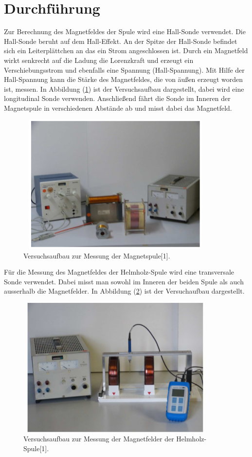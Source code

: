 \section{Durchführung}
Zur Berechnung des Magnetfeldes der Spule wird eine Hall-Sonde verwendet.
Die Hall-Sonde beruht auf dem Hall-Effekt. An der Spitze der Hall-Sonde befindet sich
ein Leiterplättchen an das ein Strom angeschlossen ist. Durch ein Magnetfeld wirkt senkrecht
auf die Ladung die Lorenzkraft und erzeugt ein Verschiebungsstrom und ebenfalls eine Spannung (Hall-Spannung).
Mit Hilfe der Hall-Spannung kann die Stärke des Magnetfeldes, die von äußen erzeugt worden ist, messen.
In Abbildung (\ref{abb:4}) ist der Versuchsaufbau dargestellt, dabei wird eine longitudinal Sonde verwenden.
Anschließend fährt die Sonde im Inneren der Magnetspule in verschiedenen Abstände ab und misst dabei das
Magnetfeld.
\begin{figure}[H]
  \centering
  \includegraphics[width=10cm, height= 7cm]{Abb4.png}
  \caption{Versuchsaufbau zur Messung der Magnetspule[1].}
  \label{abb:4}
\end{figure}
Für die Messung des Magnetfeldes der Helmholz-Spule wird eine transversale Sonde verwendet.
Dabei misst man sowohl im Inneren der beiden Spule als auch ausserhalb die Magnetfelder.
In Abbildung (\ref{abb:5}) ist der Versuchaufbau dargestellt.
\begin{figure}[H]
  \centering
  \includegraphics[width=10cm, height= 7cm]{Abb5.png}
  \caption{Versuchsaufbau zur Messung der Magnetfelder der Helmholz-Spule[1].}
  \label{abb:5}
\end{figure}

